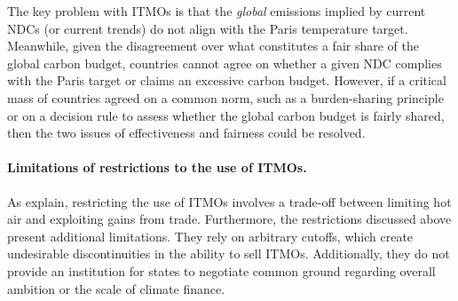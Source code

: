 \documentclass[12pt,english]{article}
\begin{document}

The key problem with ITMOs is that the \textit{global} emissions implied by current NDCs (or current trends) do not align with the Paris temperature target. 
Meanwhile, given the disagreement over what constitutes a fair share of the global carbon budget, countries cannot agree on whether a given NDC complies with the Paris target or %
claims an excessive carbon budget. However, if a critical mass of countries agreed on a common norm, such as a burden-sharing principle or on a decision rule to assess whether the global carbon budget is fairly shared, then the two issues of effectiveness %
and fairness could be resolved. 

\paragraph{Limitations of restrictions to the use of ITMOs.}
As \cite{mehling_governing_2019} explain, restricting the use of ITMOs involves a trade-off between limiting hot air and exploiting gains from trade. Furthermore, the restrictions discussed above present additional limitations. They rely on arbitrary cutoffs, which create undesirable discontinuities in the ability to sell ITMOs. Additionally, they do not provide an institution for states to negotiate %
common ground regarding overall ambition or the scale of climate finance. 
\end{document}
